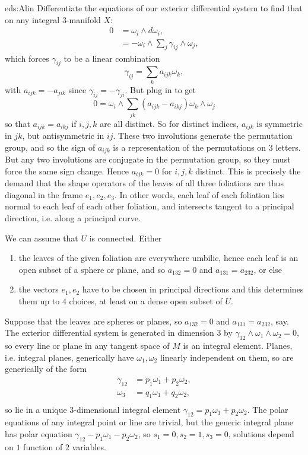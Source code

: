 \begin{answer}{eds:Alin}
Differentiate the equations of our exterior differential system to find that on any integral \(3\)-manifold \(X\):
\begin{align*}
0
&=
\omega_i\wedge d\omega_i,
\\
&=
-\omega_i\wedge\sum_j\gamma_{ij}\wedge\omega_j,
\end{align*}
which forces \(\gamma_{ij}\) to be a linear combination
\[
\gamma_{ij}=\sum_k a_{ijk}\omega_k,
\]
with \(a_{ijk}=-a_{jik}\) since \(\gamma_{ij}=-\gamma_{ji}\).
But plug in to get
\[
0=\omega_i\wedge\sum_{jk}(a_{ijk}-a_{ikj})\omega_k\wedge\omega_j
\]
so that \(a_{ijk}=a_{ikj}\) if \(i,j,k\) are all distinct.
So for distinct indices, \(a_{ijk}\) is symmetric in \(jk\), but antisymmetric in \(ij\).
These two involutions generate the permutation group, and so the sign of \(a_{ijk}\) is a representation of the permutations on \(3\) letters.
But any two involutions are conjugate in the permutation group, so they must force the same sign change.
Hence \(a_{ijk}=0\) for \(i,j,k\) distinct.
This is precisely the demand that the shape operators of the leaves of all three foliations are thus diagonal in the frame \(e_1,e_2,e_3\).
In other words, each leaf of each foliation lies normal to each leaf of each other foliation, and intersects tangent to a principal direction, i.e. along a principal curve.

We can assume that \(U\) is connected.
Either
\begin{enumerate}
\item
the leaves of the given foliation are everywhere umbilic, hence each leaf is an open subset of a sphere or plane, and so \(a_{132}=0\) and \(a_{131}=a_{232}\), or else 
\item
the vectors \(e_1,e_2\) have to be chosen in principal directions and this determines them up to \(4\) choices, at least on a dense open subset of \(U\).
\end{enumerate}

Suppose that the leaves are spheres or planes, so \(a_{132}=0\) and \(a_{131}=a_{232}\), say.
The exterior differential system is generated in dimension \(3\) by \(\gamma_{12}\wedge\omega_1\wedge\omega_2=0\), so every line or plane in any tangent space of \(M\) is an integral element.
Planes, i.e. integral planes, generically have \(\omega_1,\omega_2\) linearly independent on them, so are generically of the form 
\begin{align*}
\gamma_{12}&=p_1\omega_1+p_2\omega_2,\\
\omega_3&=q_1\omega_1+q_2\omega_2,\\
\end{align*}
so lie in a unique \(3\)-dimensional integral element \(\gamma_{12}=p_1\omega_1+p_2\omega_2\).
The polar equations of any integral point or line are trivial, but the generic integral plane has polar equation \(\gamma_{12}-p_1\omega_1-p_2\omega_2\), so \(s_1=0,s_2=1,s_3=0\), solutions depend on \(1\) function of \(2\) variables.


\end{answer}
